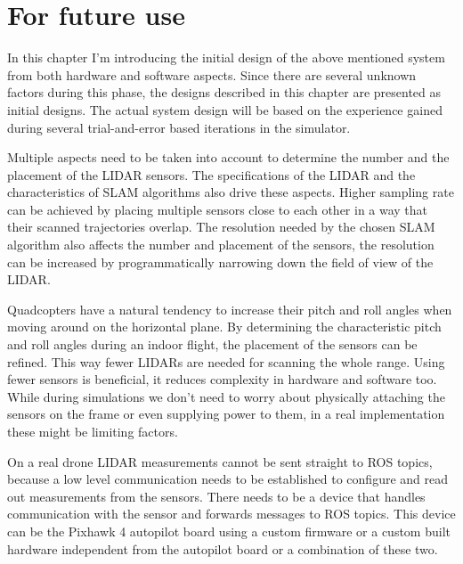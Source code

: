 \chapter{For future use} \label{chap:future_use}


In this chapter I'm introducing the initial design of the above mentioned system from both hardware and
software aspects. Since there are several unknown factors 
during this phase, the designs described in this chapter are presented as initial designs. The actual
system design will be based on the experience gained during several trial-and-error based iterations
in the simulator.

Multiple aspects need to be taken into account to determine the number and the placement of the LIDAR sensors.
The specifications of the LIDAR and the characteristics of SLAM algorithms also drive these aspects. 
Higher sampling rate can be achieved by placing multiple sensors close to each other in a way that 
their scanned trajectories overlap. The resolution needed by the chosen SLAM algorithm also affects 
the number and placement of the sensors, the resolution can be increased by programmatically narrowing
down the field of view of the LIDAR.

Quadcopters have a natural tendency to increase their pitch and roll angles when moving around 
on the horizontal plane. By determining the characteristic pitch and roll angles during an indoor flight,
the placement of the sensors can be refined. This way fewer LIDARs are needed for scanning the
whole range. Using fewer sensors is beneficial, it reduces complexity in hardware and software too.
While during simulations we don't need to worry about physically attaching the sensors on the frame or even
supplying power to them, in a real implementation these might be limiting factors.

On a real drone LIDAR measurements cannot be sent straight to ROS topics, because a low level communication needs
to be established to configure and read out measurements from the sensors. There needs to be a device that 
handles communication with the sensor and forwards messages to ROS topics.
This device can be the Pixhawk 4 autopilot board using a custom firmware or a custom built hardware 
independent from the autopilot board or a combination of these two.

